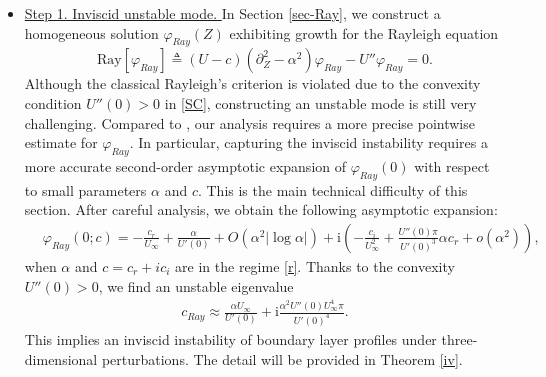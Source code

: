 \documentclass[reqno,11pt]{amsart}
\numberwithin{equation}{section}
\numberwithin{equation}{section}
\theoremstyle{plain}
\begin{document}
\begin{itemize}
	\item \underline{Step 1. Inviscid unstable mode. } In Section \ref{sec-Ray}, we construct a homogeneous solution $\varphi_{Ray}(Z)$ exhibiting growth for the Rayleigh equation
	$$\mathrm{Ray}[\varphi_{Ray}]\triangleq(U-c)(\partial_Z^2-\alpha^2)\varphi_{Ray}-U''\varphi_{Ray}=0.
	$$
	Although the classical Rayleigh's criterion is violated due to the convexity condition $U''(0)>0$ in \eqref{SC}, constructing an unstable mode is still very challenging. Compared to  \cite{GGN-DMJ}, our analysis requires a more precise pointwise estimate for $\varphi_{Ray}$. In particular, capturing the inviscid instability requires a more accurate second-order asymptotic expansion of $\varphi_{Ray}(0)$ with respect to small parameters $\alpha$ and $c$.  This is the main technical difficulty of this section. After  careful analysis, we obtain the following asymptotic expansion:
	\begin{align}
	~~~~\varphi_{Ray}(0;c)=-\frac{c_r}{U_{\infty}}+\frac{\alpha}{U'(0)}+O(\alpha^2|\log\alpha|)+\mathrm{ i}\left(-\frac{c_i}{U_\infty^2}+\frac{U''(0)\pi}{U'(0)^3}\alpha c_r+o(\alpha^2)\right),\nonumber
	\end{align}
when $\alpha$ and $c=c_r+ic_i$ are in the regime \eqref{r}.  Thanks to the convexity $U''(0)>0$, we find an unstable eigenvalue 
	\begin{align}
	c_{Ray}\approx\frac{\alpha U_{\infty}}{U'(0)}+\mathrm{ i}\frac{\alpha^2\nonumber U''(0)U_{\infty}^4\pi}{U'(0)^4}.
	\end{align}
	 This implies an inviscid instability of boundary layer profiles under three-dimensional perturbations. The detail will be provided in Theorem \ref{iv}.\\
	

\end{itemize}
\end{document}
